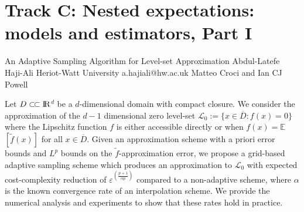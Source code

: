 \section{Track C: Nested expectations: models and estimators, Part I}\newpage

\begin{talk}
  {An Adaptive Sampling Algorithm for Level-set Approximation}%
  {Abdul-Latefe Haji-Ali}%
  {Heriot-Watt University}%
  {a.hajiali@hw.ac.uk}%
  {Matteo Croci and Ian CJ Powell}%
  {}%
    

  Let $D\subset\joinrel\subset\rm{I\!R}$$^d$ be a $d$-dimensional domain with compact
closure. We consider the approximation of the $d-1$ dimensional zero level-set
$\mathcal{L}_0 := \{x \in \overline{D} : f(x) = 0\}$ where the Lipschitz function $f$ is either
accessible directly or when $f(x) = \mathbb{E}$$\left[\tilde{f}(x)\right]$ for
all $x \in \overline{D}$. Given an approximation scheme with a priori error bounds
and $L^p$ bounds on the $\tilde{f}$-approximation error, we propose a
grid-based adaptive sampling scheme which produces an approximation to $\mathcal{L}_0$
with expected cost-complexity reduction of $\varepsilon^{\left(\frac{p+1}{\alpha p}\right)}$
compared to a non-adaptive scheme, where $\alpha$ is the known convergence rate of
an interpolation scheme. We provide the numerical analysis and experiments to
show that these rates hold in practice.

\medskip


\end{talk}

